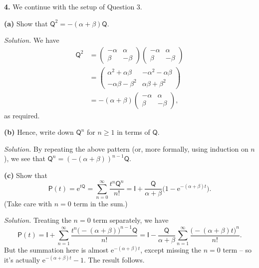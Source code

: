 \documentclass[
  a4paper,
]{article}
\theoremstyle{definition}
\theoremstyle{definition}
\theoremstyle{definition}
\theoremstyle{remark}
\begin{document}
\textbf{4.} We continue with the setup of Question 3.

\textbf{(a)} Show that \(\mathsf Q^2 = -(\alpha + \beta) \mathsf Q\).

\begin{myanswers}
\emph{Solution.}
We have
\begin{align*}
\mathsf Q^2 &= \begin{pmatrix} -\alpha & \alpha \\ \beta & -\beta \end{pmatrix}\begin{pmatrix} -\alpha & \alpha \\ \beta & -\beta \end{pmatrix} \\ &= \begin{pmatrix} \alpha^2 + \alpha\beta & -\alpha^2 - \alpha\beta \\ -\alpha\beta - \beta^2 & \alpha\beta + \beta^2 \end{pmatrix} \\ &= -(\alpha + \beta) \begin{pmatrix} -\alpha & \alpha \\ \beta & -\beta \end{pmatrix} , 
\end{align*}
as required.

\end{myanswers}

\textbf{(b)} Hence, write down \(\mathsf Q^n\) for \(n \geq 1\) in terms of \(\mathsf Q\).

\begin{myanswers}
\emph{Solution.}
By repeating the above pattern (or, more formally, using induction on \(n\)), we see that \(\mathsf Q^n = (-(\alpha+\beta))^{n-1} \mathsf Q\).

\end{myanswers}

\textbf{(c)} Show that
\[ \mathsf P(t) = \mathrm{e}^{t\mathsf Q} = \sum_{n=0}^\infty \frac{t^n \mathsf Q^n}{n!} = \mathsf I + \frac{\mathsf{Q}}{\alpha + \beta} \big(1 - \mathrm{e}^{-(\alpha+\beta)t} \big) . \]
(Take care with \(n = 0\) term in the sum.)

\begin{myanswers}
\emph{Solution.}
Treating the \(n = 0\) term separately, we have
\[ \mathsf P(t) = \mathsf I + \sum_{n=1}^\infty \frac{t^n\big(-(\alpha+\beta)\big)^{n-1}\mathsf Q}{n!} = \mathsf I - \frac{\mathsf Q }{\alpha+\beta} \sum_{n=1}^\infty \frac{\big(-(\alpha+\beta)t\big)^{n}}{n!} .     \]
But the summation here is almost \(\mathrm{e}^{-(\alpha + \beta)t}\), except missing the \(n=0\) term -- so it's actually \(\mathrm{e}^{-(\alpha + \beta)t} - 1\). The result follows.

\end{myanswers}
\end{document}
